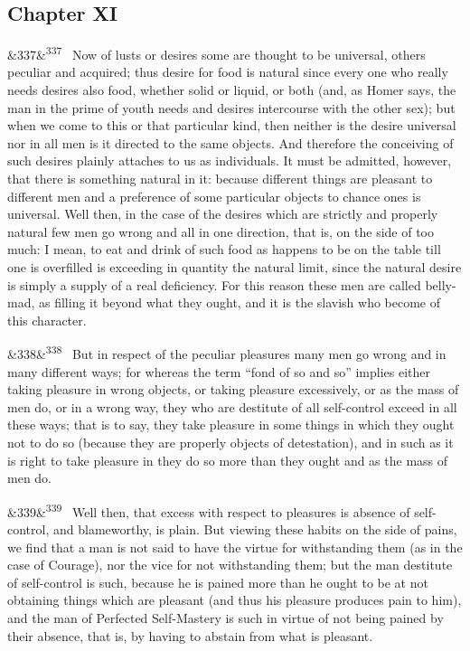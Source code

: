 \documentclass[12pt]{article}
\newcommand{\para}[1][]{\par\noindent\ifx&#1&\else\textsuperscript{\footnotesize #1}~\fi}
\begin{document}
\subsection*{Chapter XI}

\para[337] Now of lusts or desires some are thought to be universal, others peculiar and acquired; thus desire for food is natural since every one who really needs desires also food, whether solid or liquid, or both (and, as Homer says, the man in the prime of youth needs and desires intercourse with the other sex); but when we come to this or that particular kind, then neither is the desire universal nor in all men is it directed to the same objects. And therefore the conceiving of such desires plainly attaches to us as individuals. It must be admitted, however, that there is something natural in it: because different things are pleasant to different men and a preference of some particular objects to chance ones is universal. Well then, in the case of the desires which are strictly and properly natural few men go wrong and all in one direction, that is, on the side of too much: I mean, to eat and drink of such food as happens to be on the table till one is overfilled is exceeding in quantity the natural limit, since the natural desire is simply a supply of a real deficiency. For this reason these men are called belly-mad, as filling it beyond what they ought, and it is the slavish who become of this character.

\para[338] But in respect of the peculiar pleasures many men go wrong and in many different ways; for whereas the term “fond of so and so” implies either taking pleasure in wrong objects, or taking pleasure excessively, or as the mass of men do, or in a wrong way, they who are destitute of all self-control exceed in all these ways; that is to say, they take pleasure in some things in which they ought not to do so (because they are properly objects of detestation), and in such as it is right to take pleasure in they do so more than they ought and as the mass of men do.

\para[339] Well then, that excess with respect to pleasures is absence of self-control, and blameworthy, is plain. But viewing these habits on the side of pains, we find that a man is not said to have the virtue for withstanding them (as in the case of Courage), nor the vice for not withstanding them; but the man destitute of self-control is such, because he is pained more than he ought to be at not obtaining things which are pleasant (and thus his pleasure produces pain to him), and the man of Perfected Self-Mastery is such in virtue of not being pained by their absence, that is, by having to abstain from what is pleasant.
\end{document}
